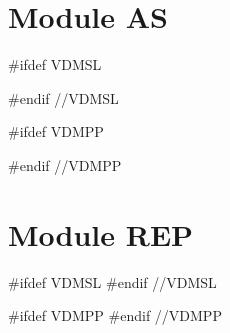 \documentclass[a4paper,dvips]{article}
\begin{document}
\section{Module AS}

#ifdef VDMSL

#endif //VDMSL

#ifdef VDMPP

#endif //VDMPP



\section{Module REP}

#ifdef VDMSL
%
#endif //VDMSL


#ifdef VDMPP
%
#endif //VDMPP






\newpage
{}
\printindex
\end{document}
